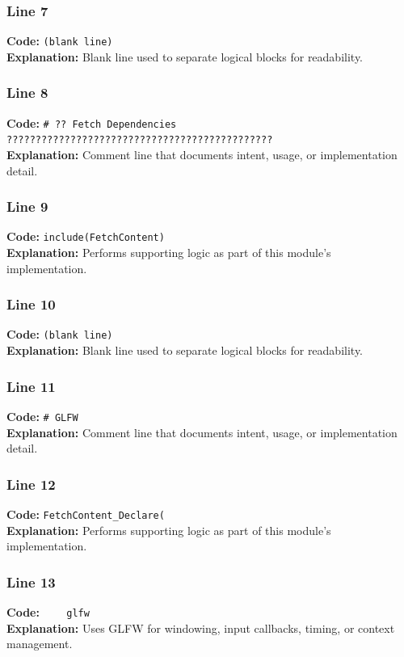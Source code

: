 \documentclass[11pt,a4paper]{article}
\begin{document}
\subsubsection*{Line 7}
\textbf{Code:} \texttt{(blank line)}\\
\textbf{Explanation:} Blank line used to separate logical blocks for readability.

\subsubsection*{Line 8}
\textbf{Code:} \verb|# ?? Fetch Dependencies ??????????????????????????????????????????????|\\
\textbf{Explanation:} Comment line that documents intent, usage, or implementation detail.

\subsubsection*{Line 9}
\textbf{Code:} \verb|include(FetchContent)|\\
\textbf{Explanation:} Performs supporting logic as part of this module's implementation.

\subsubsection*{Line 10}
\textbf{Code:} \texttt{(blank line)}\\
\textbf{Explanation:} Blank line used to separate logical blocks for readability.

\subsubsection*{Line 11}
\textbf{Code:} \verb|# GLFW|\\
\textbf{Explanation:} Comment line that documents intent, usage, or implementation detail.

\subsubsection*{Line 12}
\textbf{Code:} \verb|FetchContent_Declare(|\\
\textbf{Explanation:} Performs supporting logic as part of this module's implementation.

\subsubsection*{Line 13}
\textbf{Code:} \verb|    glfw|\\
\textbf{Explanation:} Uses GLFW for windowing, input callbacks, timing, or context management.
\end{document}
